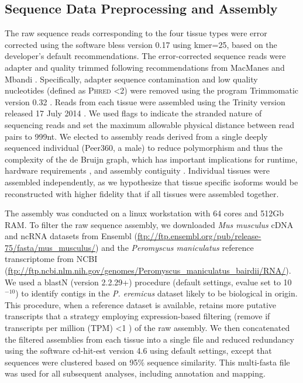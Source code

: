 \documentclass[11pt]{article}
\begin{document}
\subsection*{Sequence Data Preprocessing and Assembly}

The raw sequence reads corresponding to the four tissue types were error corrected using the software bless version 0.17 \cite{Heo:2014cb} using kmer=25, based on the developer's default recommendations. The error-corrected sequence reads were adapter and quality trimmed following recommendations from MacManes \cite{MacManes:2014io} and Mbandi \cite{Christoffels:2014bg}. Specifically, adapter sequence contamination and low quality nucleotides (defined as \textsc{Phred} \textless 2) were removed using the program Trimmomatic version 0.32  \cite{Lohse:2012fg}. Reads from each tissue were assembled using the Trinity version released 17 July 2014 \cite{Haas:2013jq}. We used flags to indicate the stranded nature of sequencing reads and set the maximum allowable physical distance between read pairs to 999nt. We elected to assembly reads derived from a single deeply sequenced individual (Peer360, a male) to reduce polymorphism and thus the complexity of the de Bruijn graph, which has important implications for runtime, hardware requirements \cite{Lowe:2014iv,Pop:2009dp}, and assembly contiguity \cite{Vijay:2012gy and MacManes unpublished observations}. Individual tissues were assembled independently, as we hypothesize that tissue specific isoforms would be reconstructed with higher fidelity that if all tissues were assembled together. 


The assembly was conducted on a linux workstation with 64 cores and 512Gb RAM. To filter the raw sequence assembly, we downloaded \textit{Mus musculus} cDNA and ncRNA datasets from Ensembl (\url{ftp://ftp.ensembl.org/pub/release-75/fasta/mus_musculus/}) and the \textit{Peromyscus maniculatus} reference transcriptome from NCBI (\url{ftp://ftp.ncbi.nlm.nih.gov/genomes/Peromyscus_maniculatus_bairdii/RNA/}). We used a blastN (version 2.2.29+) procedure (default settings, evalue set to 10$^{-10}$) to identify contigs in the \textit{P. eremicus} dataset likely to be biological in origin. This procedure, when a reference dataset is available, retains more putative transcripts that a strategy employing expression-based filtering (remove if transcripts per million (TPM) \textless 1  \cite{MacManes:2012bu}) of the raw assembly. We then concatenated the filtered assemblies from each tissue into a single file and reduced redundancy using the software cd-hit-est version 4.6 \cite{Li:2006hr} using default settings, except that sequences were clustered based on 95\% sequence similarity. This multi-fasta file was used for all subsequent analyses, including annotation and mapping. \\
\end{document}

